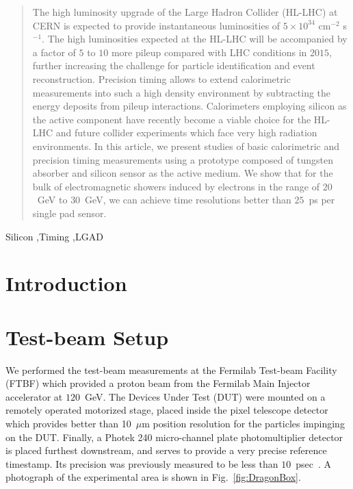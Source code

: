 \documentclass[preprint,1p]{elsarticle}
\begin{document}
\begin{frontmatter}
\begin{abstract}
The high luminosity upgrade of the Large Hadron Collider (HL-LHC) at CERN is
expected to provide instantaneous luminosities of $5\times 10^{34}$ cm$^{-2}$
s$^{-1}$. The high luminosities expected at the HL-LHC will be accompanied by a
factor of $5$ to $10$ more pileup compared with LHC conditions in $2015$,
further increasing the challenge for particle identification and event
reconstruction. Precision timing allows to extend calorimetric measurements into
such a high density environment by subtracting the energy deposits from pileup
interactions. Calorimeters employing silicon as the active component have
recently become a viable choice for the HL-LHC and future collider experiments
which face very high radiation environments. In this article, we present studies
of basic calorimetric and precision timing measurements using a prototype
composed of tungsten absorber and silicon sensor as the active medium. We show
that for the bulk of electromagnetic showers induced by electrons in the range
of $20$~GeV to $30$~GeV, we can achieve time resolutions better than $25$~ps per
single pad sensor. 

\end{abstract}

\begin{keyword}

Silicon \sep Timing \sep LGAD

\end{keyword}

\end{frontmatter}


\section{Introduction} 

\section{Test-beam Setup} 

We performed the test-beam measurements at the Fermilab Test-beam Facility
(FTBF) which provided a proton beam from the Fermilab Main Injector accelerator
at $120$~GeV. The Devices Under Test (DUT) were mounted on a remotely operated
motorized stage, placed inside the pixel telescope detector~\cite{KWAN2016162}
which provides better than 10~$\mu$m position resolution for the particles
impinging on the DUT. Finally, a Photek 240 micro-channel plate photomultiplier
detector~\cite{Anderson:2015gha, MCPFastCaloNIMA, Ronzhin2015288,Ronzhin201552}
is placed furthest downstream, and serves to provide a very precise reference
timestamp. Its precision was previously measured to be less than
$10$~psec~\cite{Ronzhin2015288}. A photograph of the experimental area is shown
in Fig.~\ref{fig:DragonBox}. 
\end{document}
